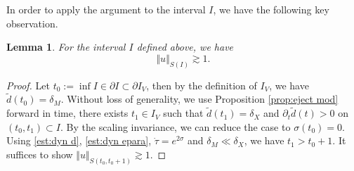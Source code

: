 \documentclass[reqno, 11pt]{amsart}
\numberwithin{equation}{section}
\theoremstyle{plain}
\newtheorem{lemma}[theorem]{Lemma}
\theoremstyle{definition}
\numberwithin{equation}{section}
\numberwithin{theorem}{section}
\numberwithin{equation}{section}
\numberwithin{equation}{section}
\numberwithin{theorem}{section}
\begin{document}
	In order to apply the argument to the interval $I$, we have the following key observation.
	\begin{lemma} For the interval $I$ defined above, we have
		\begin{equation*}
		\Vert u \Vert_{S(I)} \gtrsim 1.
		\end{equation*}
	\end{lemma}
	\begin{proof}
		Let $t_0:=\inf I\in\partial I\subset\partial I_V$, then by the definition of $I_V$, we have $\widetilde{d}(t_0)=\delta_{M}$. Without loss of generality, we use Proposition \ref{prop:eject mod} forward in time, there exists $t_1\in I_V$ such that $\widetilde{d}(t_1)=\delta_{X}$ and $\partial_t\widetilde{d}(t)>0$ on $(t_0,t_1)\subset I$. By the scaling invariance, we can reduce the case to $\sigma(t_0)=0$. Using \eqref{est:dyn d}, \eqref{est:dyn epara}, $\dot{\tau}=e^{2\sigma}$ and  $\delta_{M}\ll \delta_{X}$, we have $t_1>t_0 +1$. It suffices to show $\Vert u \Vert_{S(t_0,t_0+1)}\gtrsim1$.
		

\end{proof}
\end{document}
